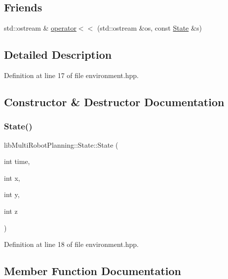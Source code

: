 \subsection*{Friends}
\begin{DoxyCompactItemize}
\item 
std\+::ostream \& \hyperlink{structlib_multi_robot_planning_1_1_state_a5604754e63c801276d20313c05a68847}{operator$<$$<$} (std\+::ostream \&os, const \hyperlink{structlib_multi_robot_planning_1_1_state}{State} \&s)
\end{DoxyCompactItemize}


\subsection{Detailed Description}


Definition at line 17 of file environment.\+hpp.



\subsection{Constructor \& Destructor Documentation}
\mbox{\label{structlib_multi_robot_planning_1_1_state_af7aabb0901e59446d9067f2747a85fc2}} 
\subsubsection{\texorpdfstring{State()}{State()}}
{\footnotesize\ttfamily lib\+Multi\+Robot\+Planning\+::\+State\+::\+State (\begin{DoxyParamCaption}\item[{int}]{time,  }\item[{int}]{x,  }\item[{int}]{y,  }\item[{int}]{z }\end{DoxyParamCaption})\hspace{0.3cm}{\ttfamily [inline]}}



Definition at line 18 of file environment.\+hpp.



\subsection{Member Function Documentation}
\mbox{\label{structlib_multi_robot_planning_1_1_state_a1067b5c669fb82dce96b4f07476ea655}} 
